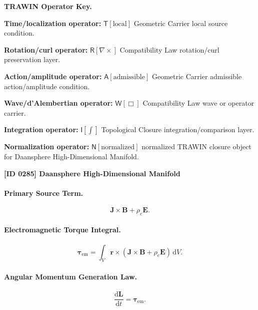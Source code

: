 \par\vspace{0.45\baselineskip}
\noindent\begin{minipage}[t]{\linewidth}
\begingroup
\small
\raggedright
\textbf{TRAWIN Operator Key.}\par
\noindent\textbf{Time/localization operator:} $\mathsf{T}\!\left[\mathrm{local}\right]$ Geometric Carrier local source condition.\par
\noindent\textbf{Rotation/curl operator:} $\mathsf{R}\!\left[\nabla\times\right]$ Compatibility Law rotation/curl preservation layer.\par
\noindent\textbf{Action/amplitude operator:} $\mathsf{A}\!\left[\mathrm{admissible}\right]$ Geometric Carrier admissible action/amplitude condition.\par
\noindent\textbf{Wave/d'Alembertian operator:} $\mathsf{W}\!\left[\Box\right]$ Compatibility Law wave or operator carrier.\par
\noindent\textbf{Integration operator:} $\mathsf{I}\!\left[\int\right]$ Topological Closure integration/comparison layer.\par
\noindent\textbf{Normalization operator:} $\mathsf{N}\!\left[\mathrm{normalized}\right]$ normalized TRAWIN closure object for Daansphere High-Dimensional Manifold.\par
\endgroup
\end{minipage}

\clearpage
\noindent\textbf{[ID 0285] Daansphere High-Dimensional Manifold}\par
\vspace{0.35em}
\paragraph{Primary Source Term.}
\begin{equation}
\mathbf{J}\times\mathbf{B}
+
\rho_e\mathbf{E}.
\end{equation}

\paragraph{Electromagnetic Torque Integral.}
\begin{equation}
\boldsymbol{\tau}_{\mathrm{em}}
=
\int_V
\mathbf{r}\times
\left(
\mathbf{J}\times\mathbf{B}
+
\rho_e\mathbf{E}
\right)
\,\mathrm{d}V .
\end{equation}

\paragraph{Angular Momentum Generation Law.}
\begin{equation}
\frac{\mathrm{d}\mathbf{L}}{\mathrm{d}t}
=
\boldsymbol{\tau}_{\mathrm{em}} .
\end{equation}

